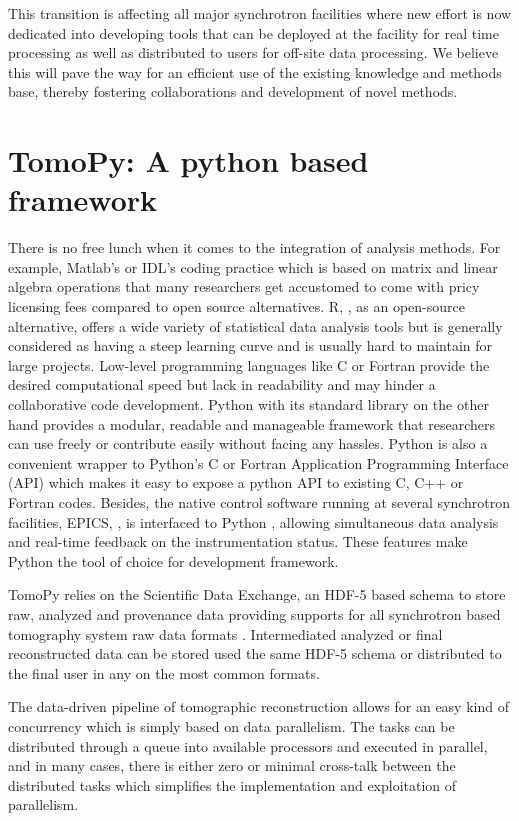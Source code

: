 \documentclass[pdf]{iucr}              %
\begin{document}
This transition is affecting all major synchrotron facilities where new effort is now dedicated into developing tools that can be deployed at the facility for real time processing as well as distributed to users for off-site data processing. We believe this will pave the way for an efficient use of the existing knowledge and methods base, thereby fostering collaborations and development of novel methods.

\section{TomoPy: A python based framework}

There is no free lunch when it comes to the integration of analysis methods. For example, Matlab's or IDL's coding practice which is based on matrix and linear algebra operations that many researchers get accustomed to come with pricy licensing fees compared to open source alternatives. R, \cite{r}, as an open-source alternative, offers a wide variety of statistical data analysis tools but is generally considered as having a steep learning curve and is usually hard to maintain for large projects. Low-level programming languages like C or Fortran provide the desired computational speed but lack in readability and may hinder a collaborative code development. Python with its standard library on the other hand provides a modular, readable and manageable framework that researchers can use freely or contribute easily without facing any hassles. Python is also a convenient wrapper to Python's C or Fortran Application Programming Interface (API) which makes it easy to expose a python API to existing C, C++ or Fortran codes. Besides, the native  control software running at several synchrotron facilities, EPICS, \cite{epics}, is interfaced to Python \cite{pyepics}, allowing simultaneous data analysis and real-time feedback on the instrumentation status. These features make Python the tool of choice for development framework.

TomoPy relies on the Scientific Data Exchange, an HDF-5 based schema to store raw, analyzed and provenance data providing supports for all synchrotron based tomography system raw data formats \cite{data_exchange}.
Intermediated analyzed or final reconstructed data can be stored used the same HDF-5 schema or distributed to the final user in any on the most common formats.

The data-driven pipeline of tomographic reconstruction allows for an easy kind of concurrency which is simply based on data parallelism. The tasks can be distributed through a queue into available processors and executed in parallel, and in many cases, there is either zero or minimal cross-talk between the distributed tasks which simplifies the implementation and exploitation of parallelism.
\end{document}
